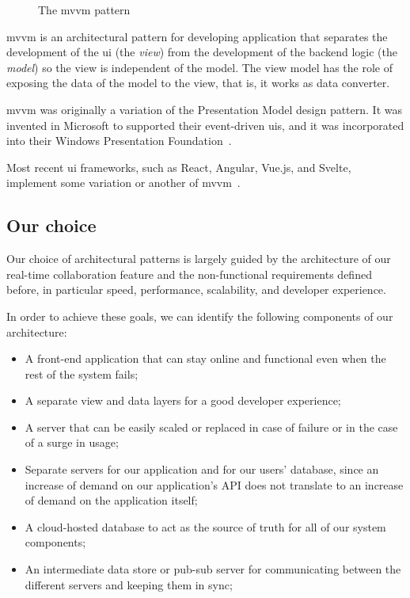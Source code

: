 \begin{toexclude}
\begin{figure}[H]

		\caption{The \acrshort{mvvm} pattern}
		\label{fig:mvvm-arch}
	\end{figure}

	\acrfull{mvvm} is an architectural pattern for developing application that separates the development of the \acrfull{ui} (the \emph{view}) from the development of the backend logic (the \emph{model}) so the view is independent of the model.
	The view model has the role of exposing the data of the model to the view, that is, it works as data converter.

	\acrshort{mvvm} was originally a variation of the Presentation Model design pattern. It was invented in Microsoft to supported their event-driven \acrshort{ui}s, and it was incorporated into their Windows Presentation Foundation~\autocite{smith_patterns_2009}.

	Most recent \acrshort{ui} frameworks, such as React, Angular, Vue.js, and Svelte, implement some variation or another of \acrshort{mvvm}~\autocite{noauthor_javascript_nodate}.

	\subsection{Our choice}

	Our choice of architectural patterns is largely guided by the architecture of our real-time collaboration feature and the non-functional requirements defined before, in particular speed, performance, scalability, and developer experience.

	In order to achieve these goals, we can identify the following components of our architecture:

	\begin{itemize}
		\item A front-end application that can stay online and functional even when the rest of the system fails;
		\item A separate view and data layers for a good developer experience;
		\item A server that can be easily scaled or replaced in case of failure or in the case of a surge in usage;
		\item Separate servers for our application and for our users' database, since an increase of demand on our application's API does not translate to an increase of demand on the application itself;
		\item A cloud-hosted database to act as the source of truth for all of our system components;
		\item An intermediate data store or pub-sub server for communicating between the different servers and keeping them in sync;
	\end{itemize}


\end{toexclude}
